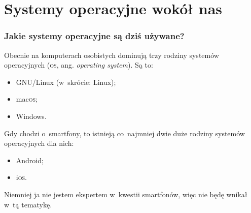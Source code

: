 \documentclass[10pt,t]{beamer}
\begin{document}
\section{Systemy operacyjne wokół nas}


\begin{frame}
  \frametitle{Jakie systemy operacyjne są dziś używane?}


  Obecnie na komputerach osobistych dominują trzy rodziny systemów
  operacyjnych (\textsc{os}, ang. \textit{operating system}). Są to:
  \begin{itemize}

  \item GNU/Linux (w~skrócie: Linux);

  \item mac\textsc{os};

  \item Windows.

  \end{itemize}

  Gdy chodzi o~smartfony, to istnieją co~najmniej dwie duże rodziny systemów
  operacyjnych dla nich:
  \begin{itemize}

  \item Android;

  \item i\textsc{os}.

  \end{itemize}
  Niemniej ja nie jestem ekspertem w~kwestii smartfonów, więc nie będę
  wnikał w~tą tematykę.


\end{frame}
\end{document}
